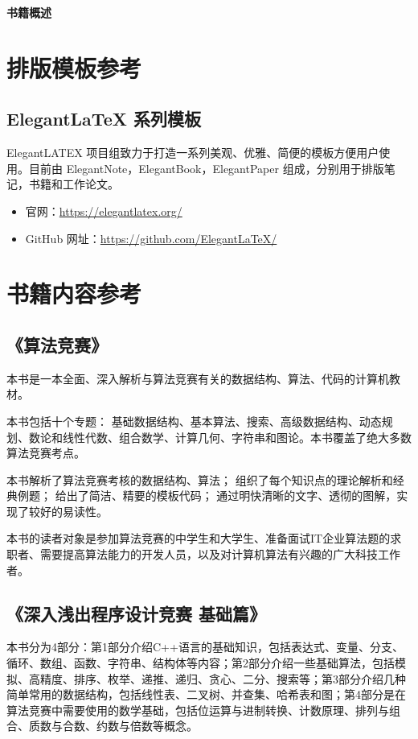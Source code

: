 \frontmatter
\thispagestyle{empty}
\begin{center}
	\textbf{\LARGE 书籍概述}
\end{center}

\section*{排版模板参考}
\subsection*{Elegant\LaTeX{} 系列模板 \md{[核心版本]}}
ElegantLATEX 项目组致力于打造一系列美观、优雅、简便的模板方便用户使用。目前由
ElegantNote，ElegantBook，ElegantPaper 组成，分别用于排版笔记，书籍和工作论文。
\begin{itemize}
	\item 官网：\href{https://elegantlatex.org/}{https://elegantlatex.org/}
	\item GitHub 网址：\href{https://github.com/ElegantLaTeX/}{https://github.com/ElegantLaTeX/}
\end{itemize} 
\section*{书籍内容参考}
\subsection*{《算法竞赛》 \md{[罗勇军]}}
本书是一本全面、深入解析与算法竞赛有关的数据结构、算法、代码的计算机教材。

本书包括十个专题： 基础数据结构、基本算法、搜索、高级数据结构、动态规划、数论和线性代数、组合数学、计算几何、字符串和图论。本书覆盖了绝大多数算法竞赛考点。

本书解析了算法竞赛考核的数据结构、算法； 组织了每个知识点的理论解析和经典例题； 给出了简洁、精要的模板代码； 通过明快清晰的文字、透彻的图解，实现了较好的易读性。

本书的读者对象是参加算法竞赛的中学生和大学生、准备面试IT企业算法题的求职者、需要提高算法能力的开发人员，以及对计算机算法有兴趣的广大科技工作者。
\subsection*{《深入浅出程序设计竞赛 基础篇》 \md{[汪楚奇]}}
本书分为4部分：第1部分介绍C++语言的基础知识，包括表达式、变量、分支、循环、数组、函数、字符串、结构体等内容；第2部分介绍一些基础算法，包括模拟、高精度、排序、枚举、递推、递归、贪心、二分、搜索等；第3部分介绍几种简单常用的数据结构，包括线性表、二叉树、并查集、哈希表和图；第4部分是在算法竞赛中需要使用的数学基础，包括位运算与进制转换、计数原理、排列与组合、质数与合数、约数与倍数等概念。

